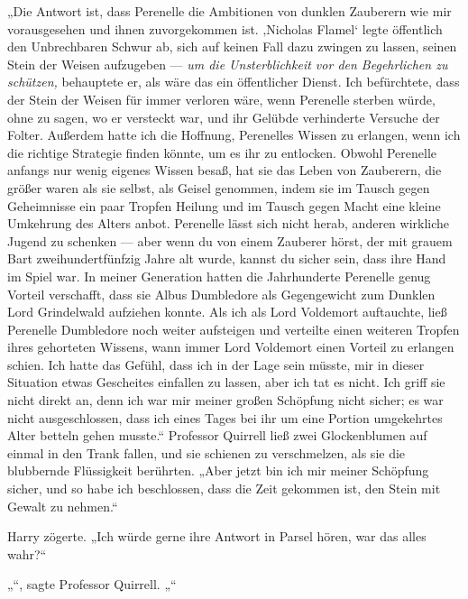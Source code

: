 „Die Antwort ist, dass Perenelle die Ambitionen von dunklen Zauberern wie mir vorausgesehen und ihnen zuvorgekommen ist. ‚Nicholas Flamel‘ legte öffentlich den Unbrechbaren Schwur ab, sich auf keinen Fall dazu zwingen zu lassen, seinen Stein der Weisen aufzugeben — \emph{um die Unsterblichkeit vor den Begehrlichen zu schützen,} behauptete er, als wäre das ein öffentlicher Dienst. Ich befürchtete, dass der Stein der Weisen für immer verloren wäre, wenn Perenelle sterben würde, ohne zu sagen, wo er versteckt war, und ihr Gelübde verhinderte Versuche der Folter. Außerdem hatte ich die Hoffnung, Perenelles Wissen zu erlangen, wenn ich die richtige Strategie finden könnte, um es ihr zu entlocken. Obwohl Perenelle anfangs nur wenig eigenes Wissen besaß, hat sie das Leben von Zauberern, die größer waren als sie selbst, als Geisel genommen, indem sie im Tausch gegen Geheimnisse ein paar Tropfen Heilung und im Tausch gegen Macht eine kleine Umkehrung des Alters anbot. Perenelle lässt sich nicht herab, anderen wirkliche Jugend zu schenken — aber wenn du von einem Zauberer hörst, der mit grauem Bart zweihundertfünfzig Jahre alt wurde, kannst du sicher sein, dass ihre Hand im Spiel war. In meiner Generation hatten die Jahrhunderte Perenelle genug Vorteil verschafft, dass sie Albus Dumbledore als Gegengewicht zum Dunklen Lord Grindelwald aufziehen konnte. Als ich als Lord Voldemort auftauchte, ließ Perenelle Dumbledore noch weiter aufsteigen und verteilte einen weiteren Tropfen ihres gehorteten Wissens, wann immer Lord Voldemort einen Vorteil zu erlangen schien. Ich hatte das Gefühl, dass ich in der Lage sein müsste, mir in dieser Situation etwas Gescheites einfallen zu lassen, aber ich tat es nicht. Ich griff sie nicht direkt an, denn ich war mir meiner großen Schöpfung nicht sicher; es war nicht ausgeschlossen, dass ich eines Tages bei ihr um eine Portion umgekehrtes Alter betteln gehen musste.“
Professor Quirrell ließ zwei Glockenblumen auf einmal in den Trank fallen, und sie schienen zu verschmelzen, als sie die blubbernde Flüssigkeit berührten.
„Aber jetzt bin ich mir meiner Schöpfung sicher, und so habe ich beschlossen, dass die Zeit gekommen ist, den Stein mit Gewalt zu nehmen.“

Harry zögerte.
„Ich würde gerne ihre Antwort in Parsel hören, war das alles wahr?“

„“, sagte Professor Quirrell.
„“

